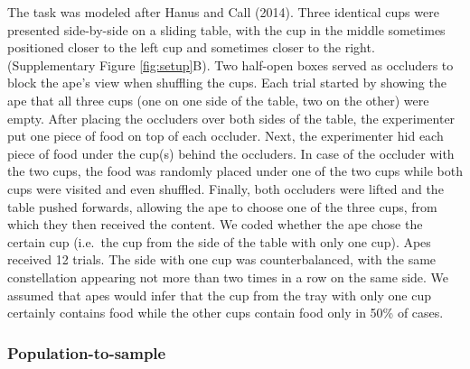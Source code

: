 \documentclass[
  man,floatsintext]{apa6}
\begin{document}
The task was modeled after Hanus and Call (2014). Three identical cups were presented side-by-side on a sliding table, with the cup in the middle sometimes positioned closer to the left cup and sometimes closer to the right. (Supplementary Figure \ref{fig:setup}B). Two half-open boxes served as occluders to block the ape's view when shuffling the cups. Each trial started by showing the ape that all three cups (one on one side of the table, two on the other) were empty. After placing the occluders over both sides of the table, the experimenter put one piece of food on top of each occluder. Next, the experimenter hid each piece of food under the cup(s) behind the occluders. In case of the occluder with the two cups, the food was randomly placed under one of the two cups while both cups were visited and even shuffled. Finally, both occluders were lifted and the table pushed forwards, allowing the ape to choose one of the three cups, from which they then received the content. We coded whether the ape chose the certain cup (i.e.~the cup from the side of the table with only one cup). Apes received 12 trials. The side with one cup was counterbalanced, with the same constellation appearing not more than two times in a row on the same side. We assumed that apes would infer that the cup from the tray with only one cup certainly contains food while the other cups contain food only in 50\% of cases.

\hypertarget{population-to-sample}{%
\subsubsection{Population-to-sample}\label{population-to-sample}}
\end{document}
